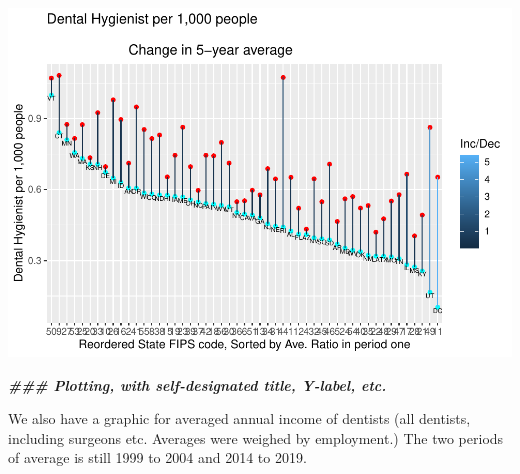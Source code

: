\documentclass[
]{article}
\newenvironment{Shaded}{\begin{snugshade}}{\end{snugshade}}
\newcommand{\DocumentationTok}[1]{\textcolor[rgb]{0.56,0.35,0.01}{\textbf{\textit{#1}}}}
\begin{document}
\includegraphics{Change_By_State_Graphic_Reproduction_files/figure-latex/unnamed-chunk-6-1.pdf}

\begin{Shaded}
\begin{Highlighting}[]
\DocumentationTok{\#\#\# Plotting, with self{-}designated title, Y{-}label, etc.}
\end{Highlighting}
\end{Shaded}

We also have a graphic for averaged annual income of dentists (all
dentists, including surgeons etc. Averages were weighed by employment.)
The two periods of average is still 1999 to 2004 and 2014 to 2019.
\end{document}

